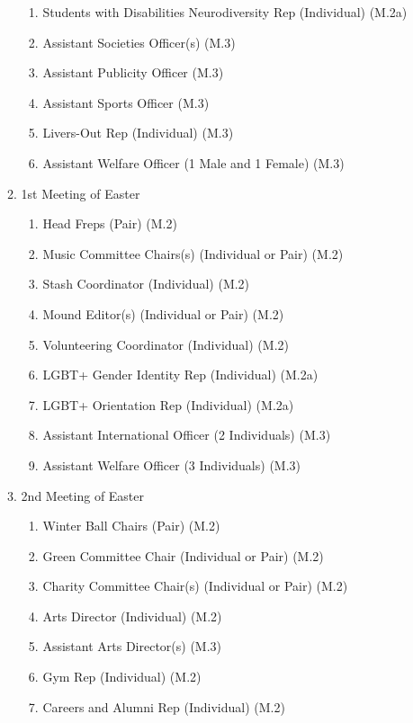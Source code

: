 \begin{enumerate}
\begin{enumerate}
\begin{enumerate}
            \item Students with Disabilities Neurodiversity Rep  (Individual) (M.2a)
            \item Assistant Societies Officer(s) (M.3)
            \item Assistant Publicity Officer (M.3)
            \item Assistant Sports Officer (M.3)
            \item Livers-Out Rep (Individual) (M.3)
            \item Assistant Welfare Officer (1 Male and 1 Female) (M.3)
        \end{enumerate}
        \item 1st Meeting of Easter
        \begin{enumerate}
            \item Head Freps (Pair) (M.2)
            \item Music Committee Chairs(s) (Individual or Pair) (M.2)
            \item Stash Coordinator (Individual) (M.2)
            \item Mound Editor(s) (Individual or Pair) (M.2)
            \item Volunteering Coordinator (Individual) (M.2)
            \item LGBT+ Gender Identity Rep (Individual) (M.2a)
            \item LGBT+ Orientation Rep (Individual) (M.2a)
            \item Assistant International Officer (2 Individuals) (M.3)
            \item Assistant Welfare Officer (3 Individuals) (M.3)
        \end{enumerate}
        \item 2nd Meeting of Easter
        \begin{enumerate}
            \item Winter Ball Chairs (Pair) (M.2)
            \item Green Committee Chair (Individual or Pair) (M.2)
            \item Charity Committee Chair(s) (Individual or Pair) (M.2)
            \item Arts Director (Individual) (M.2)
            \item Assistant Arts Director(s) (M.3)
            \item Gym Rep (Individual) (M.2)
            \item Careers and Alumni Rep (Individual) (M.2)

\end{enumerate}
\end{enumerate}
\end{enumerate}

